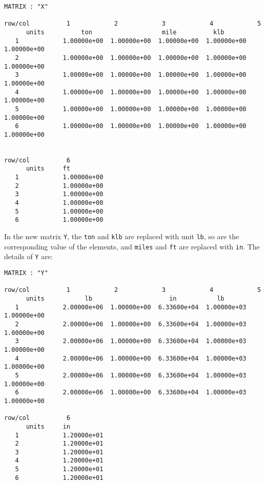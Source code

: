 \begin{footnotesize}
\begin{verbatim}
MATRIX : "X"

row/col          1            2            3            4            5        
      units          ton                   mile          klb                  
   1            1.00000e+00  1.00000e+00  1.00000e+00  1.00000e+00  1.00000e+00
   2            1.00000e+00  1.00000e+00  1.00000e+00  1.00000e+00  1.00000e+00
   3            1.00000e+00  1.00000e+00  1.00000e+00  1.00000e+00  1.00000e+00
   4            1.00000e+00  1.00000e+00  1.00000e+00  1.00000e+00  1.00000e+00
   5            1.00000e+00  1.00000e+00  1.00000e+00  1.00000e+00  1.00000e+00
   6            1.00000e+00  1.00000e+00  1.00000e+00  1.00000e+00  1.00000e+00


row/col          6          
      units     ft   
   1            1.00000e+00
   2            1.00000e+00 
   3            1.00000e+00 
   4            1.00000e+00 
   5            1.00000e+00 
   6            1.00000e+00 
\end{verbatim}
\end{footnotesize}

\vspace{0.15 in}\noindent
In the new matrix {\tt Y}, the {\tt ton} and {\tt klb}
are replaced with unit {\tt lb},
so are the corresponding value of the elements,
and {\tt miles} and {\tt ft} are replaced with {\tt in}.
The details of {\tt Y} are:

\begin{footnotesize}
\begin{verbatim}
MATRIX : "Y"

row/col          1            2            3            4            5           
      units           lb                     in           lb                     
   1            2.00000e+06  1.00000e+00  6.33600e+04  1.00000e+03  1.00000e+00  
   2            2.00000e+06  1.00000e+00  6.33600e+04  1.00000e+03  1.00000e+00  
   3            2.00000e+06  1.00000e+00  6.33600e+04  1.00000e+03  1.00000e+00  
   4            2.00000e+06  1.00000e+00  6.33600e+04  1.00000e+03  1.00000e+00  
   5            2.00000e+06  1.00000e+00  6.33600e+04  1.00000e+03  1.00000e+00  
   6            2.00000e+06  1.00000e+00  6.33600e+04  1.00000e+03  1.00000e+00  

row/col          6 
      units     in   
   1            1.20000e+01
   2            1.20000e+01
   3            1.20000e+01
   4            1.20000e+01
   5            1.20000e+01
   6            1.20000e+01
\end{verbatim}
\end{footnotesize}

